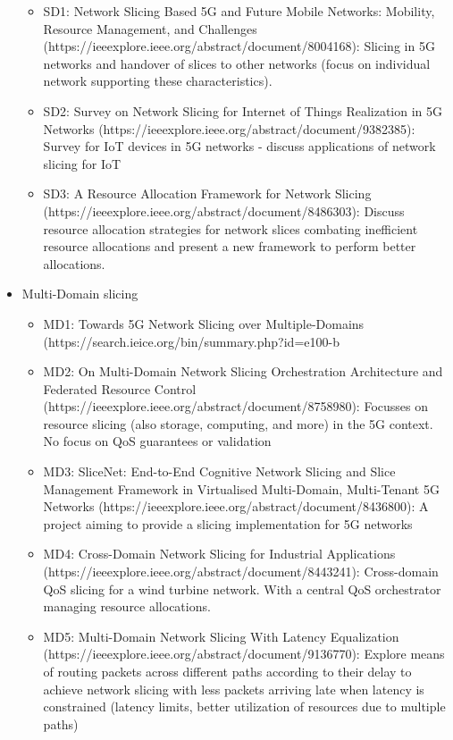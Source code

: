 \documentclass{article}
\begin{document}
\begin{itemize}
    \begin{itemize}
        \item SD1: Network Slicing Based 5G and Future Mobile Networks: Mobility, Resource Management, and Challenges (https://ieeexplore.ieee.org/abstract/document/8004168): Slicing in 5G networks and handover of slices to other networks (focus on individual network supporting these characteristics).
        \item SD2: Survey on Network Slicing for Internet of Things Realization in 5G Networks (https://ieeexplore.ieee.org/abstract/document/9382385): Survey for IoT devices in 5G networks - discuss applications of network slicing for IoT
        \item SD3: A Resource Allocation Framework for Network Slicing (https://ieeexplore.ieee.org/abstract/document/8486303): Discuss resource allocation strategies for network slices combating inefficient resource allocations and present a new framework to perform better allocations.
    \end{itemize}
    \item Multi-Domain slicing
    \begin{itemize}
        \item MD1: Towards 5G Network Slicing over Multiple-Domains (https://search.ieice.org/bin/summary.php?id=e100-b%
        \item MD2: On Multi-Domain Network Slicing Orchestration Architecture and Federated Resource Control (https://ieeexplore.ieee.org/abstract/document/8758980): Focusses on resource slicing (also storage, computing, and more) in the 5G context. No focus on QoS guarantees or validation
        \item MD3: SliceNet: End-to-End Cognitive Network Slicing and Slice Management Framework in Virtualised Multi-Domain, Multi-Tenant 5G Networks (https://ieeexplore.ieee.org/abstract/document/8436800): A project aiming to provide a slicing implementation for 5G networks
        \item MD4: Cross-Domain Network Slicing for Industrial Applications (https://ieeexplore.ieee.org/abstract/document/8443241): Cross-domain QoS slicing for a wind turbine network. With a central QoS orchestrator managing resource allocations.
        \item MD5: Multi-Domain Network Slicing With Latency Equalization (https://ieeexplore.ieee.org/abstract/document/9136770): Explore means of routing packets across different paths according to their delay to achieve network slicing with less packets arriving late when latency is constrained (latency limits, better utilization of resources due to multiple paths)

\end{itemize}
\end{itemize}
\end{document}
